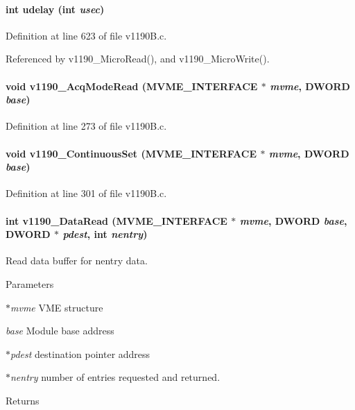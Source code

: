 \paragraph[{udelay}]{\setlength{\rightskip}{0pt plus 5cm}int udelay (int {\em usec})}\hfill\label{v1190B_8c_aeaa5c434da81fbdf4a665b67f66592bc}


Definition at line 623 of file v1190B.c.

Referenced by v1190\_\-MicroRead(), and v1190\_\-MicroWrite().
\paragraph[{v1190\_\-AcqModeRead}]{\setlength{\rightskip}{0pt plus 5cm}void v1190\_\-AcqModeRead ({\bf MVME\_\-INTERFACE} $\ast$ {\em mvme}, \/  {\bf DWORD} {\em base})}\hfill\label{v1190B_8c_adcf811a607936b82759f90d9b9f27bff}


Definition at line 273 of file v1190B.c.
\paragraph[{v1190\_\-ContinuousSet}]{\setlength{\rightskip}{0pt plus 5cm}void v1190\_\-ContinuousSet ({\bf MVME\_\-INTERFACE} $\ast$ {\em mvme}, \/  {\bf DWORD} {\em base})}\hfill\label{v1190B_8c_ac49fded0e6607ba8c67460b8e825e33b}


Definition at line 301 of file v1190B.c.
\paragraph[{v1190\_\-DataRead}]{\setlength{\rightskip}{0pt plus 5cm}int v1190\_\-DataRead ({\bf MVME\_\-INTERFACE} $\ast$ {\em mvme}, \/  {\bf DWORD} {\em base}, \/  {\bf DWORD} $\ast$ {\em pdest}, \/  int {\em nentry})}\hfill\label{v1190B_8c_a3fb3376a4705f511733ade46e23388e3}
Read data buffer for nentry data. 
\begin{DoxyParams}{Parameters}
\item[{\em $\ast$mvme}]VME structure \item[{\em base}]Module base address \item[{\em $\ast$pdest}]destination pointer address \item[{\em $\ast$nentry}]number of entries requested and returned. \end{DoxyParams}
\begin{DoxyReturn}{Returns}

\end{DoxyReturn}


